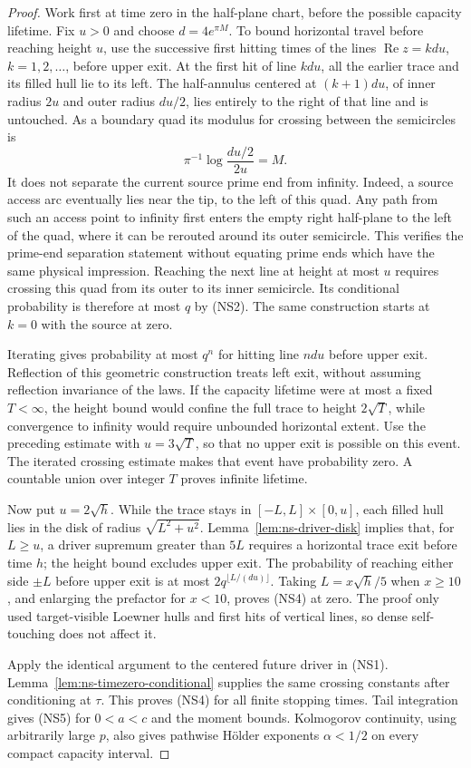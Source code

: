 \documentclass[11pt]{article}
\theoremstyle{definition}\newtheorem{definition}[theorem]{Definition}
\theoremstyle{remark}\newtheorem{remark}[theorem]{Remark}
\begin{document}
\begin{proof}
Work first at time zero in the half-plane chart, before the possible
capacity lifetime. Fix $u>0$ and choose $d=4e^{\pi M}$. To bound
horizontal travel before reaching height $u$, use the successive first hitting
times of the lines $\operatorname{Re}z=kdu$, $k=1,2,\ldots$, before
upper exit. At the first hit of line $kdu$, all the earlier trace and
its filled hull lie to its left. The half-annulus centered at
$(k+1)du$, of inner radius $2u$ and outer radius $du/2$, lies entirely
to the right of that line and is untouched. As a boundary quad its
modulus for crossing between the semicircles is
\[
 \pi^{-1}\log\frac{du/2}{2u}=M.
\]
It does not separate the current source prime end from infinity.
Indeed, a source access arc eventually lies near the tip, to the left
of this quad. Any path from such an access point to infinity first
enters the empty right half-plane to the left of the quad, where it
can be rerouted around its outer semicircle. This verifies the
prime-end separation statement without equating prime ends which
have the same physical impression. Reaching the next line at height
at most $u$ requires
crossing this quad from its outer to its inner semicircle. Its
conditional probability is therefore at most $q$ by (NS2).
The same construction starts at $k=0$ with the source at zero.

Iterating gives probability at most $q^n$ for hitting line $ndu$
before upper exit. Reflection of this geometric construction treats
left exit, without assuming reflection invariance of the laws. If
the capacity lifetime were at most a fixed $T<\infty$, the height
bound would confine the full trace to height $2\sqrt T$, while
convergence to infinity would require unbounded horizontal extent.
Use the preceding estimate with $u=3\sqrt T$, so that no upper exit
is possible on this event.
The iterated crossing estimate makes that event have probability zero.
A countable union over integer $T$ proves infinite lifetime.

Now put $u=2\sqrt h$. While the trace stays in
$[-L,L]\times[0,u]$, each filled hull lies in the disk of radius
$\sqrt{L^2+u^2}$. Lemma~\ref{lem:ns-driver-disk} implies that, for
$L\ge u$, a driver supremum greater than $5L$ requires a horizontal
trace exit before time $h$; the height bound excludes upper exit.
The probability of reaching either side $\pm L$ before upper exit
is at most $2q^{\lfloor L/(du)\rfloor}$. Taking
$L=x\sqrt h/5$ when $x\ge10$, and enlarging the prefactor for
$x<10$, proves (NS4) at zero. The proof only used target-visible
Loewner hulls and first hits of vertical lines, so dense self-touching
does not affect it.

Apply the identical argument to the centered future driver in (NS1).
Lemma~\ref{lem:ns-timezero-conditional} supplies the same crossing
constants after conditioning at $\tau$. This proves (NS4) for all
finite stopping times. Tail integration gives (NS5) for $0<a<c$
and the moment bounds. Kolmogorov continuity, using arbitrarily
large $p$, also gives pathwise H\"older exponents $\alpha<1/2$
on every compact capacity interval.
\end{proof}
\end{document}
